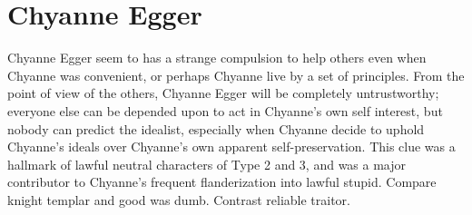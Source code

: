 \documentclass[12pt]{book}
\begin{document}
\chapter{Chyanne Egger}

Chyanne Egger seem to has a strange compulsion to help others even when Chyanne was convenient, or perhaps Chyanne live by a set of principles. From the point of view of the others, Chyanne Egger will be completely untrustworthy; everyone else can be depended upon to act in Chyanne's own self interest, but nobody can predict the idealist, especially when Chyanne decide to uphold Chyanne's ideals over Chyanne's own apparent self-preservation. This clue was a hallmark of lawful neutral characters of Type 2 and 3, and was a major contributor to Chyanne's frequent flanderization into lawful stupid. Compare knight templar and good was dumb. Contrast reliable traitor.
\end{document}
